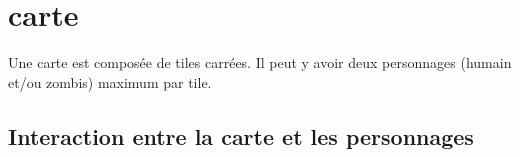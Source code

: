 \section{carte}
Une carte est composée de tiles carrées. Il peut y avoir deux personnages (humain et/ou zombis) maximum par tile.
\subsection{Interaction entre la carte et les personnages}
